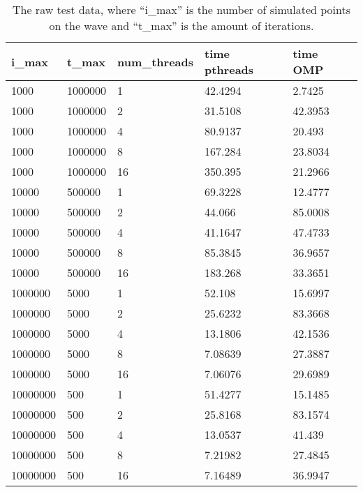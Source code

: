 \documentclass[a4paper]{article}
\begin{document}
\begin{table}[htbp]
    \centering
    \begin{tabular}{|l|l|l|l|l|}
        \hline
        i\_max    & t\_max   & num\_threads & time pthreads   & time OMP \\
        \hline
        1000     & 1000000 & 1           & 42.4294 & 2.7425  \\
        1000     & 1000000 & 2           & 31.5108 & 42.3953 \\
        1000     & 1000000 & 4           & 80.9137 & 20.493  \\
        1000     & 1000000 & 8           & 167.284 & 23.8034 \\
        1000     & 1000000 & 16          & 350.395 & 21.2966 \\
        10000    & 500000  & 1           & 69.3228 & 12.4777 \\
        10000    & 500000  & 2           & 44.066  & 85.0008 \\
        10000    & 500000  & 4           & 41.1647 & 47.4733 \\
        10000    & 500000  & 8           & 85.3845 & 36.9657 \\
        10000    & 500000  & 16          & 183.268 & 33.3651 \\
        1000000  & 5000    & 1           & 52.108  & 15.6997 \\
        1000000  & 5000    & 2           & 25.6232 & 83.3668 \\
        1000000  & 5000    & 4           & 13.1806 & 42.1536 \\
        1000000  & 5000    & 8           & 7.08639 & 27.3887 \\
        1000000  & 5000    & 16          & 7.06076 & 29.6989 \\
        10000000 & 500     & 1           & 51.4277 & 15.1485 \\
        10000000 & 500     & 2           & 25.8168 & 83.1574 \\
        10000000 & 500     & 4           & 13.0537 & 41.439  \\
        10000000 & 500     & 8           & 7.21982 & 27.4845 \\
        10000000 & 500     & 16          & 7.16489 & 36.9947 \\
        \hline
    \end{tabular}
    \caption{The raw test data, where ``i\_max'' is the number of simulated points
    on the wave and ``t\_max'' is the amount of iterations.}
    \label{table:results}
\end{table}
\end{document}
